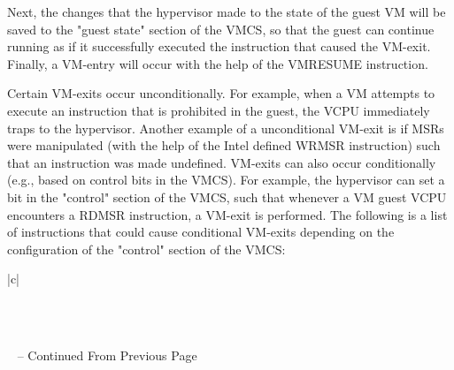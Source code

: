 \documentclass{report}
\begin{document}
\begin{spacing}{1.5}
{\noindent Next, the changes that the hypervisor made to the state of the guest VM will be saved to the "guest state" section of the VMCS, so that the guest can continue running as if it successfully executed the instruction that caused the VM-exit. Finally, a VM-entry will occur with the help of the VMRESUME instruction.
\newline
}

{\large
\noindent Certain VM-exits occur unconditionally. For example, when a VM attempts to execute an instruction that is prohibited in the guest, the VCPU immediately traps to the hypervisor. Another example of a unconditional VM-exit is if MSRs were manipulated (with the help of the Intel defined WRMSR instruction) such that an instruction was made undefined. VM-exits can also occur conditionally (e.g., based on control bits in the VMCS). For example, the hypervisor can set a bit in the "control" section of the VMCS, such that whenever a VM guest VCPU encounters a RDMSR instruction, a VM-exit is performed. The following is a list of instructions that could cause conditional VM-exits depending on the configuration of the "control" section of the VMCS: 
\leavevmode\newline


\begin{longtable}{|c|}
\caption{Instructions that could cause conditional VM-exits as defined by the VM-exit control section of the VMCS} \label{tab:long} \\

\hline {} \\ \hline 
\endfirsthead

%
{{\tablename\ \thetable{} -- Continued From Previous Page}} \\
\hline {} \\ \hline 
\endhead

\hline {} \\ \hline
\endfoot

\hline \hline
\endlastfoot


\end{longtable}}
\end{spacing}
\end{document}
